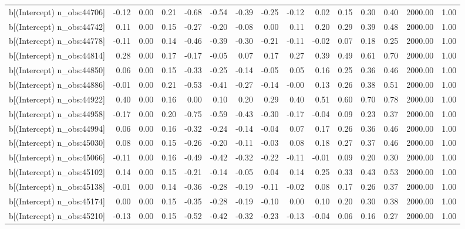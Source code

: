 \begin{table}[ht]
\begin{tabular}{rrrrrrrrrrrrrrr}
  b[(Intercept) n\_obs:44706] & -0.12 & 0.00 & 0.21 & -0.68 & -0.54 & -0.39 & -0.25 & -0.12 & 0.02 & 0.15 & 0.30 & 0.40 & 2000.00 & 1.00 \\ 
  b[(Intercept) n\_obs:44742] & 0.11 & 0.00 & 0.15 & -0.27 & -0.20 & -0.08 & 0.00 & 0.11 & 0.20 & 0.29 & 0.39 & 0.48 & 2000.00 & 1.00 \\ 
  b[(Intercept) n\_obs:44778] & -0.11 & 0.00 & 0.14 & -0.46 & -0.39 & -0.30 & -0.21 & -0.11 & -0.02 & 0.07 & 0.18 & 0.25 & 2000.00 & 1.00 \\ 
  b[(Intercept) n\_obs:44814] & 0.28 & 0.00 & 0.17 & -0.17 & -0.05 & 0.07 & 0.17 & 0.27 & 0.39 & 0.49 & 0.61 & 0.70 & 2000.00 & 1.00 \\ 
  b[(Intercept) n\_obs:44850] & 0.06 & 0.00 & 0.15 & -0.33 & -0.25 & -0.14 & -0.05 & 0.05 & 0.16 & 0.25 & 0.36 & 0.46 & 2000.00 & 1.00 \\ 
  b[(Intercept) n\_obs:44886] & -0.01 & 0.00 & 0.21 & -0.53 & -0.41 & -0.27 & -0.14 & -0.00 & 0.13 & 0.26 & 0.38 & 0.51 & 2000.00 & 1.00 \\ 
  b[(Intercept) n\_obs:44922] & 0.40 & 0.00 & 0.16 & 0.00 & 0.10 & 0.20 & 0.29 & 0.40 & 0.51 & 0.60 & 0.70 & 0.78 & 2000.00 & 1.00 \\ 
  b[(Intercept) n\_obs:44958] & -0.17 & 0.00 & 0.20 & -0.75 & -0.59 & -0.43 & -0.30 & -0.17 & -0.04 & 0.09 & 0.23 & 0.37 & 2000.00 & 1.00 \\ 
  b[(Intercept) n\_obs:44994] & 0.06 & 0.00 & 0.16 & -0.32 & -0.24 & -0.14 & -0.04 & 0.07 & 0.17 & 0.26 & 0.36 & 0.46 & 2000.00 & 1.00 \\ 
  b[(Intercept) n\_obs:45030] & 0.08 & 0.00 & 0.15 & -0.26 & -0.20 & -0.11 & -0.03 & 0.08 & 0.18 & 0.27 & 0.37 & 0.46 & 2000.00 & 1.00 \\ 
  b[(Intercept) n\_obs:45066] & -0.11 & 0.00 & 0.16 & -0.49 & -0.42 & -0.32 & -0.22 & -0.11 & -0.01 & 0.09 & 0.20 & 0.30 & 2000.00 & 1.00 \\ 
  b[(Intercept) n\_obs:45102] & 0.14 & 0.00 & 0.15 & -0.21 & -0.14 & -0.05 & 0.04 & 0.14 & 0.25 & 0.33 & 0.43 & 0.53 & 2000.00 & 1.00 \\ 
  b[(Intercept) n\_obs:45138] & -0.01 & 0.00 & 0.14 & -0.36 & -0.28 & -0.19 & -0.11 & -0.02 & 0.08 & 0.17 & 0.26 & 0.37 & 2000.00 & 1.00 \\ 
  b[(Intercept) n\_obs:45174] & 0.00 & 0.00 & 0.15 & -0.35 & -0.28 & -0.19 & -0.10 & 0.00 & 0.10 & 0.20 & 0.30 & 0.38 & 2000.00 & 1.00 \\ 
  b[(Intercept) n\_obs:45210] & -0.13 & 0.00 & 0.15 & -0.52 & -0.42 & -0.32 & -0.23 & -0.13 & -0.04 & 0.06 & 0.16 & 0.27 & 2000.00 & 1.00 \\ 

\end{tabular}
\end{table}

